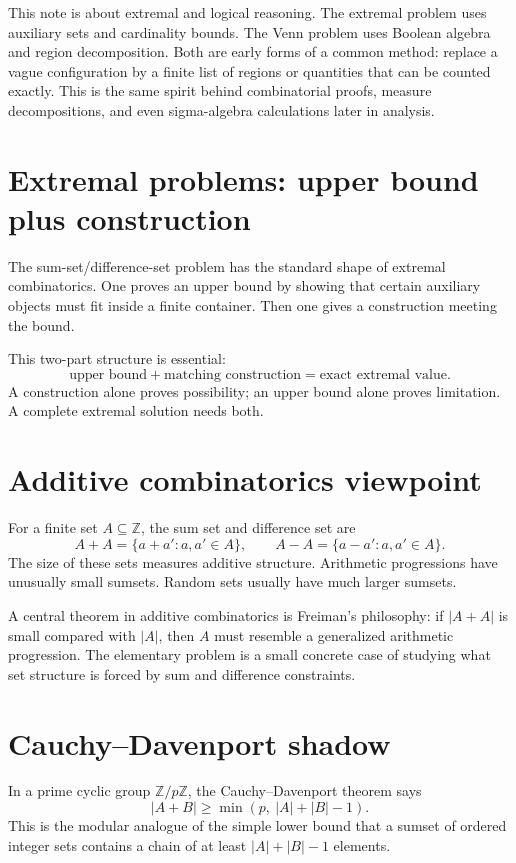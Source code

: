This note is about extremal and logical reasoning.  The extremal problem uses auxiliary sets and cardinality bounds.  The Venn problem uses Boolean algebra and region decomposition.  Both are early forms of a common method: replace a vague configuration by a finite list of regions or quantities that can be counted exactly.  This is the same spirit behind combinatorial proofs, measure decompositions, and even sigma-algebra calculations later in analysis.

\section{Extremal problems: upper bound plus construction}

The sum-set/difference-set problem has the standard shape of extremal combinatorics.  One proves an upper bound by showing that certain auxiliary objects must fit inside a finite container.  Then one gives a construction meeting the bound.

This two-part structure is essential:
\[
  \text{upper bound}+
  \text{matching construction}=\text{exact extremal value}.
\]
A construction alone proves possibility; an upper bound alone proves limitation.  A complete extremal solution needs both.

\section{Additive combinatorics viewpoint}

For a finite set \(A\subseteq\mathbb Z\), the sum set and difference set are
\[
  A+A=\{a+a':a,a'\in A\},\qquad
  A-A=\{a-a':a,a'\in A\}.
\]
The size of these sets measures additive structure.  Arithmetic progressions have unusually small sumsets.  Random sets usually have much larger sumsets.

A central theorem in additive combinatorics is Freiman's philosophy: if \(|A+A|\) is small compared with \(|A|\), then \(A\) must resemble a generalized arithmetic progression.  The elementary problem is a small concrete case of studying what set structure is forced by sum and difference constraints.

\section{Cauchy--Davenport shadow}

In a prime cyclic group \(\mathbb Z/p\mathbb Z\), the Cauchy--Davenport theorem says
\[
  |A+B|\ge \min(p,\ |A|+|B|-1).
\]
This is the modular analogue of the simple lower bound that a sumset of ordered integer sets contains a chain of at least \(|A|+|B|-1\) elements.

